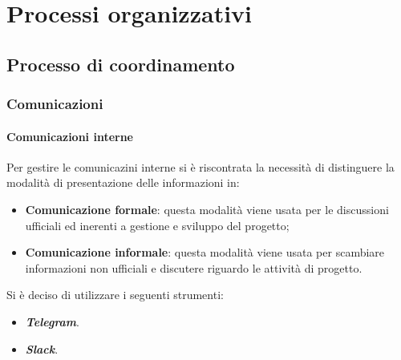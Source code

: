 \newpage
\section{Processi organizzativi}
\subsection{Processo di coordinamento}

\subsubsection{Comunicazioni}
\paragraph{Comunicazioni interne}
	Per gestire le comunicazini interne si è riscontrata la necessità di distinguere la modalità di presentazione delle informazioni in:
	\begin{itemize}
	\item\textbf{Comunicazione formale}: questa modalità viene usata per le discussioni ufficiali ed inerenti a gestione e sviluppo del progetto; 
	\item\textbf{Comunicazione informale}: questa modalità viene usata per scambiare informazioni non ufficiali e discutere riguardo le attività di progetto.
	\end{itemize}
	
	Si è deciso di utilizzare i seguenti strumenti:
	\begin{itemize}
	\item\textbf{\textit{Telegram}}.
	\item\textbf{\textit{Slack}}.
	\end{itemize}
	
